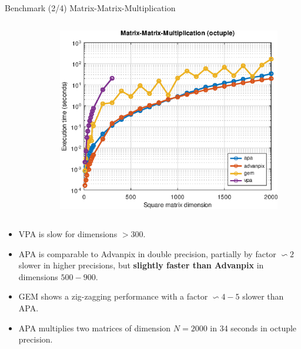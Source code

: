 \begin{frame}{Benchmark (2/4) Matrix-Matrix-Multiplication}
\begin{columns}
\begin{column}{0.3\textwidth}
\begin{figure}
\end{figure}
\end{column}
\begin{column}{0.3\textwidth}
\begin{figure}
\centering
\includegraphics[width=1.0\linewidth]{res/data/2021-11-24_run-01-mmm-octuple-semilogy}
\end{figure}
\end{column}
\end{columns}

\bigskip

\begin{itemize}
\item
VPA is slow for dimensions $> 300$.

\item
APA is comparable to Advanpix in double precision,
partially by factor $\backsim 2$ slower in higher precisions,
but \textbf{slightly faster than Advanpix} in dimensions $500 - 900$.

\item
GEM shows a zig-zagging performance with a factor $\backsim 4-5$ slower than APA.

\item
APA multiplies two matrices of dimension $N = 2000$ in 34 seconds in octuple precision.
\end{itemize}

\end{frame}


